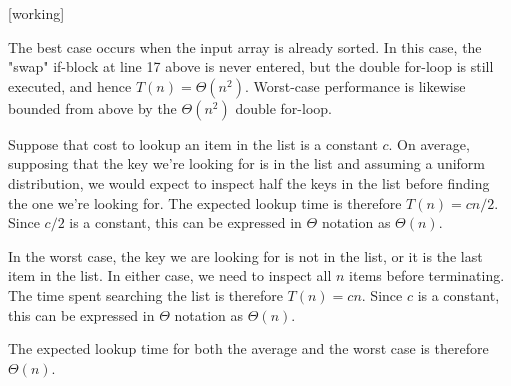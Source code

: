 \documentclass[a4paper,12pt]{article}
\begin{document}
[working]

The best case occurs when the input array is already sorted. In this case, the "swap" 
if-block at line 17 above is never entered, but the double for-loop is still executed, and hence $T(n) = \Theta(n^2)$.
Worst-case performance is likewise bounded from above by the $\Theta(n^2)$ double for-loop.

\vspace{5mm}

Suppose that cost to lookup an item in the list is a constant $c$. On average, supposing that the key we're looking for is in the list and
assuming a uniform distribution, we would expect to 
inspect half the keys in the list before finding the one we're looking for. The expected lookup time is therefore $T(n) = cn/2$. Since $c/2$ is a 
constant, this can be expressed in $\Theta$ notation as $\Theta(n)$.

In the worst case, the key we are looking for is not in the list, or it is the last item in the list. In either case, we need to inspect all $n$ items 
before terminating. The time spent searching the list is therefore $T(n) = cn$. Since $c$ is a constant, this can be expressed in $\Theta$ notation as $\Theta(n)$.

The expected lookup time for both the average and the worst case is therefore $\Theta(n)$.

\vspace{5mm}

\end{document}
